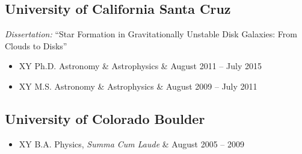 \documentclass[10pt,letterpaper]{article}
\newcommand{\textline}[2]{
  \begin{tabularx}{\textwidth}{XY}
  #1 & #2
  \end{tabularx}
}
\begin{document}
\subsection*{University of California Santa Cruz}
\emph{Dissertation:} ``Star Formation in Gravitationally Unstable Disk
Galaxies: From Clouds to Disks''\\
\begin{itemize}
\item[] \textline{Ph.D. Astronomy \& Astrophysics}{August 2011 -- July 2015}  %
\item[] \textline{M.S. Astronomy \& Astrophysics}{August 2009 -- July 2011}  %
\end{itemize}

\subsection*{University of Colorado Boulder}
\begin{itemize}
  \item[] \textline{B.A. Physics, \textit{Summa Cum Laude}}{August 2005 -- 2009}  %
\end{itemize}
\end{document}
